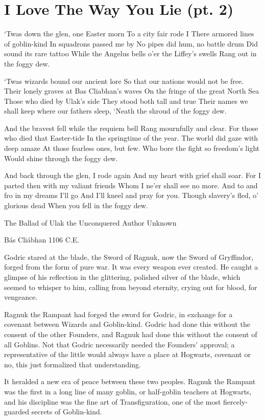 \chapter{I Love The Way You Lie (pt. 2)}
‘Twas down the glen, one Easter morn
To a city fair rode I
There armored lines of goblin-kind
In squadrons passed me by
No pipes did hum, no battle drum
Did sound its rare tattoo
While the Angelus bells o’er the Liffey’s swells
Rang out in the foggy dew.

‘Twas wizards bound our ancient lore
So that our nations would not be free.
Their lonely graves at Bas Cliabhan’s waves
On the fringe of the great North Sea
Those who died by Ulak’s side
They stood both tall and true
Their names we shall keep where our fathers sleep,
‘Neath the shroud of the foggy dew.

And the bravest fell while the requiem bell
Rang mournfully and clear.
For those who died that Easter-tide
In the springtime of the year.
The world did gaze with deep amaze
At those fearless ones, but few.
Who bore the fight so freedom’s light
Would shine through the foggy dew.

And back through the glen, I rode again
And my heart with grief shall soar.
For I parted then with my valiant friends
Whom I ne’er shall see no more.
And to and fro in my dreams I’ll go
And I’ll kneel and pray for you.
Though slavery’s fled, o’ glorious dead
When you fell in the foggy dew.

The Ballad of Ulak the Unconquered
Author Unknown

Bás Cliábhan
1106 C.E.

Godric stared at the blade, the Sword of Ragnuk, now the Sword of Gryffindor, forged from the form of pure war. It was every weapon ever created. He caught a glimpse of his reflection in the glittering, polished silver of the blade, which seemed to whisper to him, calling from beyond eternity, crying out for blood, for vengeance.

Ragnuk the Rampant had forged the sword for Godric, in exchange for a covenant between Wizards and Goblin-kind. Godric had done this without the consent of the other Founders, and Ragnuk had done this without the consent of all Goblins. Not that Godric necessarily needed the Founders’ approval; a representative of the little would always have a place at Hogwarts, covenant or no, this just formalized that understanding.

It heralded a new era of peace between these two peoples. Ragnuk the Rampant was the first in a long line of many goblin, or half-goblin teachers at Hogwarts, and his discipline was the fine art of Transfiguration, one of the most fiercely-guarded secrets of Goblin-kind.

